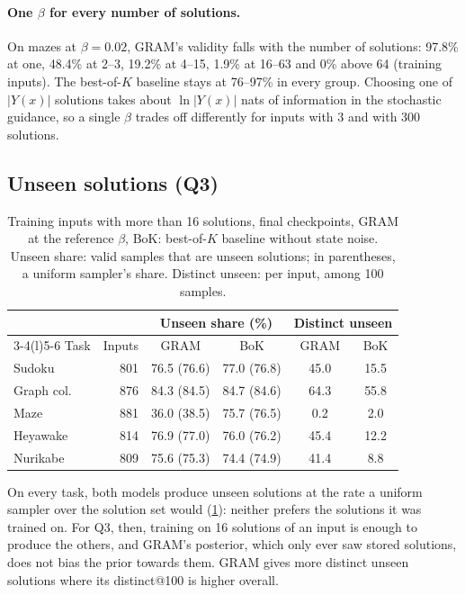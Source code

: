 \documentclass{article}
\newcommand{\bok}{best-of-$K$}
\newcommand{\Y}{|Y(x)|}
\begin{document}
\paragraph{One $\beta$ for every number of solutions.} On mazes at $\beta=0.02$, GRAM's validity falls with the number
of solutions: 97.8\% at one, 48.4\% at 2--3, 19.2\% at 4--15, 1.9\% at 16--63 and 0\% above 64 (training inputs). The
\bok{} baseline stays at 76--97\% in every group. Choosing one of $\Y$ solutions takes about $\ln\Y$ nats of
information in the stochastic guidance, so a single $\beta$ trades off differently for inputs with 3 and with 300
solutions.

\subsection{Unseen solutions (Q3)}
\label{sec:unseen}

\begin{table}[t]
\centering\footnotesize
\setlength{\tabcolsep}{2.5pt}
\begin{tabular}{@{}lrcccc@{}}
\toprule
& & \multicolumn{2}{c}{Unseen share (\%)} & \multicolumn{2}{c}{Distinct unseen} \\
\cmidrule(lr){3-4}\cmidrule(l){5-6}
Task & Inputs & GRAM & BoK & GRAM & BoK \\
\midrule
Sudoku & 801 & 76.5 (76.6) & 77.0 (76.8) & 45.0 & 15.5 \\
Graph col. & 876 & 84.3 (84.5) & 84.7 (84.6) & 64.3 & 55.8 \\
Maze & 881 & 36.0 (38.5) & 75.7 (76.5) & 0.2 & 2.0 \\
Heyawake & 814 & 76.9 (77.0) & 76.0 (76.2) & 45.4 & 12.2 \\
Nurikabe & 809 & 75.6 (75.3) & 74.4 (74.9) & 41.4 & 8.8 \\
\bottomrule
\end{tabular}
\caption{Training inputs with more than 16 solutions, final checkpoints, GRAM at the reference $\beta$, BoK: \bok{}
baseline without state noise. Unseen share: valid samples that are unseen solutions; in parentheses, a uniform
sampler's share. Distinct unseen: per input, among 100 samples.}
\label{tab:unseen}
\end{table}

On every task, both models produce unseen solutions at the rate a uniform sampler over the solution set would
(\cref{tab:unseen}): neither prefers the solutions it was trained on. For Q3, then, training on 16 solutions of an input
is enough to produce the others, and GRAM's posterior, which only ever saw stored solutions, does not bias the prior
towards them. GRAM gives more distinct unseen solutions where its distinct@100 is higher overall.
\end{document}
